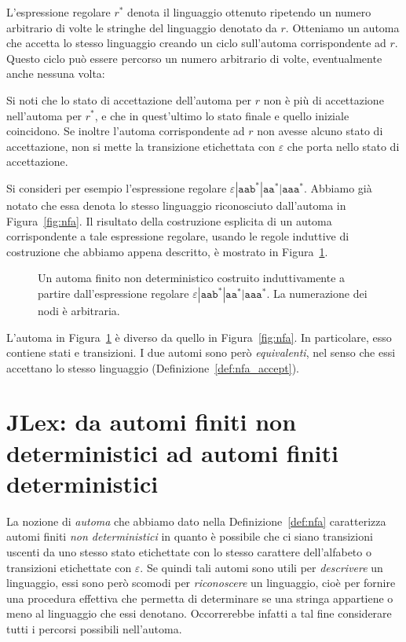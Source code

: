L'espressione regolare $r^*$ denota il linguaggio ottenuto ripetendo un
numero arbitrario di volte le stringhe del linguaggio denotato da $r$.
Otteniamo un automa che accetta lo stesso linguaggio creando un ciclo
sull'automa corrispondente ad $r$. Questo ciclo pu\`o essere percorso
un numero arbitrario di volte, eventualmente anche nessuna volta:
%
\begin{center}
\end{center}
%
Si noti che lo stato di accettazione dell'automa per $r$ non \`e pi\`u
di accettazione nell'automa per $r^*$, e che in quest'ultimo lo stato
finale e quello iniziale coincidono. Se inoltre l'automa corrispondente
ad $r$ non avesse alcuno stato di accettazione, non si mette la transizione
etichettata con $\varepsilon$ che porta nello stato di accettazione.

Si consideri per esempio l'espressione regolare
$\mathtt{\varepsilon|aab^*|aa^*|aaa^*}$. Abbiamo gi\`a notato
che essa denota lo stesso linguaggio riconosciuto dall'automa
in Figura~\ref{fig:nfa}. Il risultato della costruzione esplicita di un automa
corrispondente a tale espressione regolare, usando le regole induttive di
costruzione che abbiamo appena descritto, \`e mostrato in
Figura~\ref{fig:nfa_built}.
%
\begin{figure}[t]
\begin{center}
\end{center}
\caption{Un automa finito non deterministico costruito induttivamente a partire dall'espressione regolare $\mathtt{\varepsilon|aab^*|aa^*|aaa^*}$. La numerazione dei nodi \`e arbitraria.}\label{fig:nfa_built}
\end{figure}
%
L'automa in Figura~\ref{fig:nfa_built} \`e diverso da quello in
Figura~\ref{fig:nfa}. In particolare, esso contiene \piu stati e transizioni.
I due automi sono per\`o \emph{equivalenti}, nel senso che essi
accettano lo stesso linguaggio (Definizione~\ref{def:nfa_accept}).
%
\section{JLex:
 da automi finiti non deterministici ad automi finiti deterministici}
  \label{sec:dfa}
%
La nozione di \emph{automa} che abbiamo dato nella Definizione~\ref{def:nfa}
caratterizza automi finiti \emph{non deterministici} in quanto \`e
possibile che ci siano \piu transizioni uscenti da uno stesso stato etichettate
con lo stesso carattere dell'alfabeto o transizioni etichettate con
$\varepsilon$. Se quindi tali automi sono utili
per \emph{descrivere} un linguaggio, essi sono per\`o scomodi per
\emph{riconoscere} un linguaggio, cio\`e per fornire una procedura effettiva
che permetta di determinare se una stringa appartiene o meno al linguaggio
che essi denotano. Occorrerebbe infatti a tal fine considerare tutti
i percorsi possibili nell'automa.

